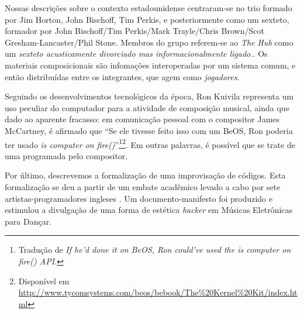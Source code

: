 Nossas descrições sobre o contexto estadounidense centraram-se no trio formado por Jim Horton, John Bischoff, Tim Perkis, e posteriormente como um sexteto, formador por John Bischoff/Tim Perkis/Mark Trayle/Chris Brown/Scot Gresham-Lancaster/Phil Stone. Membros do grupo referem-se ao \emph{The Hub} como um \emph{sexteto acusticamente divorciado mas informacionalmente ligado.}. Os materiais composicionais são infomações interoperadas por um sistema comum, e então distribuídas entre os integrantes, que agem como \emph{jogadores}. 

Seguindo os desenvolvimentos tecnológicos da época, Ron Kuivila representa um uso peculiar do computador para a atividade de composição musical, ainda que dado ao aparente fracasso: em comunicação pessoal com o compositor James McCartney, é afirmado que ``Se ele tivesse feito isso com um BeOS, Ron poderia ter usado \emph{is computer on fire()}''\footnote{Tradução de  \emph{If he'd done it on BeOS, Ron could've used the is computer on fire() API.}}\footnote{Disponível em \href{http://www.tycomsystems.com/beos/bebook/The\%20Kernel\%20Kit/index.html}{http://www.tycomsystems.com/beos/bebook/The\%20Kernel\%20Kit/index.html}}. Em outras palavras, é possível que se trate de uma programada pelo compositor.

Por último, descrevemos a formalização de uma improvisação de códigos. Esta formalização se deu a partir de um embate acadêmico levado a cabo por sete artistas-programadores ingleses \cite{ward_live_2004}. Um documento-manifesto foi produzido e estimulou a divulgação de uma forma de estética \emph{hacker} em Músicas Eletrônicas para Dançar. 